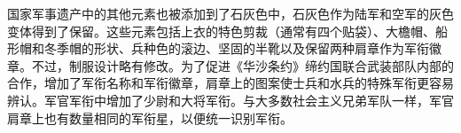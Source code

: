 国家军事遗产中的其他元素也被添加到了石灰色中，石灰色作为陆军和空军的灰色变体得到了保留。这些元素包括上衣的特色剪裁（通常有四个贴袋）、大檐帽、船形帽和冬季帽的形状、兵种色的滚边、坚固的半靴以及保留两种肩章作为军衔徽章。不过，制服设计略有修改。为了促进《华沙条约》缔约国联合武装部队内部的合作，增加了军衔名称和军衔徽章，肩章上的图案使士兵和水兵的特殊军衔更容易辨认。军官军衔中增加了少尉和大将军衔。与大多数社会主义兄弟军队一样，军官肩章上也有数量相同的军衔星，以便统一识别军衔。

